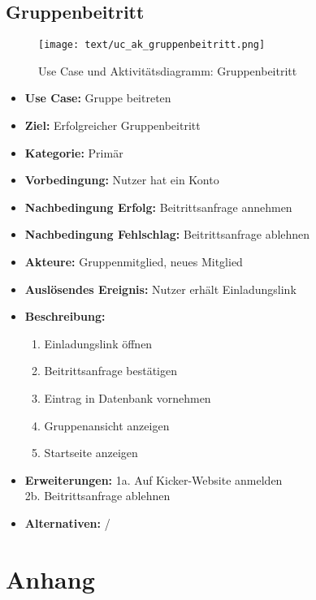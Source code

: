 \section{Gruppenbeitritt}
\begin{figure}[h!]
	\centering
	\texttt{[image: text/uc\_ak\_gruppenbeitritt.png]}
	\caption{Use Case und Aktivitätsdiagramm: Gruppenbeitritt}
	\label{uc_ac_gruppenbeitritt}
\end{figure}
\begin{itemize}
	\item \textbf{Use Case:} Gruppe beitreten
	\item \textbf{Ziel:} Erfolgreicher Gruppenbeitritt
	\item \textbf{Kategorie:} Primär
	\item \textbf{Vorbedingung:} Nutzer hat ein Konto
	\item \textbf{Nachbedingung Erfolg:} Beitrittsanfrage annehmen
	\item \textbf{Nachbedingung Fehlschlag:} Beitrittsanfrage ablehnen
	\item \textbf{Akteure:} Gruppenmitglied, neues Mitglied
	\item \textbf{Auslösendes Ereignis:} Nutzer erhält Einladungslink
	\item \textbf{Beschreibung:} \begin{enumerate}
		\item Einladungslink öffnen
		\item Beitrittsanfrage bestätigen
		\item Eintrag in Datenbank vornehmen
		\item Gruppenansicht anzeigen
		\item Startseite anzeigen
	\end{enumerate}
	\item \textbf{Erweiterungen:} 1a. Auf Kicker-Website anmelden\\
	2b. Beitrittsanfrage ablehnen
	\item \textbf{Alternativen:} /
\end{itemize}
\newpage
\chapter{Anhang}
